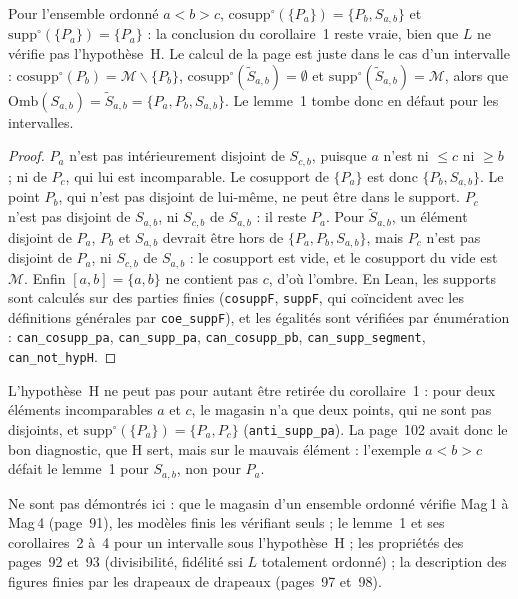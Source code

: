 \begin{center}
\end{center}

\begin{encadre}
\begin{contrexemple}
Pour l'ensemble ordonné $a < b > c$, $\mathrm{cosupp}^\circ(\{P_a\}) = \{P_b, S_{a,b}\}$ et $\mathrm{supp}^\circ(\{P_a\}) = \{P_a\}$ : la conclusion du corollaire~1 reste vraie, bien que $L$ ne vérifie pas l'hypothèse~H. Le calcul de la page est juste dans le cas d'un intervalle : $\mathrm{cosupp}^\circ(P_b) = \mathcal M \smallsetminus \{P_b\}$, $\mathrm{cosupp}^\circ(\widetilde S_{a,b}) = \emptyset$ et $\mathrm{supp}^\circ(\widetilde S_{a,b}) = \mathcal M$, alors que $\mathrm{Omb}(S_{a,b}) = \widetilde S_{a,b} = \{P_a, P_b, S_{a,b}\}$. Le lemme~1 tombe donc en défaut pour les intervalles.
\end{contrexemple}
\end{encadre}

\begin{proof}
$P_a$ n'est pas intérieurement disjoint de $S_{c,b}$, puisque $a$ n'est ni $\leq c$ ni $\geq b$ ; ni de $P_c$, qui lui est incomparable. Le cosupport de $\{P_a\}$ est donc $\{P_b, S_{a,b}\}$. Le point $P_b$, qui n'est pas disjoint de lui-même, ne peut être dans le support. $P_c$ n'est pas disjoint de $S_{a,b}$, ni $S_{c,b}$ de $S_{a,b}$ : il reste $P_a$. Pour $\widetilde S_{a,b}$, un élément disjoint de $P_a$, $P_b$ et $S_{a,b}$ devrait être hors de $\{P_a, P_b, S_{a,b}\}$, mais $P_c$ n'est pas disjoint de $P_a$, ni $S_{c,b}$ de $S_{a,b}$ : le cosupport est vide, et le cosupport du vide est $\mathcal M$. Enfin $[a,b] = \{a, b\}$ ne contient pas $c$, d'où l'ombre. En Lean, les supports sont calculés sur des parties finies (\texttt{cosuppF}, \texttt{suppF}, qui coïncident avec les définitions générales par \texttt{coe\_suppF}), et les égalités sont vérifiées par énumération : \texttt{can\_cosupp\_pa}, \texttt{can\_supp\_pa}, \texttt{can\_cosupp\_pb}, \texttt{can\_supp\_segment}, \texttt{can\_not\_hypH}.
\end{proof}

\begin{remarque}
L'hypothèse~H ne peut pas pour autant être retirée du corollaire~1 : pour deux éléments incomparables $a$ et $c$, le magasin n'a que deux points, qui ne sont pas disjoints, et $\mathrm{supp}^\circ(\{P_a\}) = \{P_a, P_c\}$ (\texttt{anti\_supp\_pa}). La page~102 avait donc le bon diagnostic, que H sert, mais sur le mauvais élément : l'exemple $a < b > c$ défait le lemme~1 pour $S_{a,b}$, non pour $P_a$.
\end{remarque}

Ne sont pas démontrés ici : que le magasin d'un ensemble ordonné vérifie Mag\,1 à Mag\,4 (page~91), les modèles finis les vérifiant seuls ; le lemme~1 et ses corollaires~2 à~4 pour un intervalle sous l'hypothèse~H ; les propriétés des pages~92 et~93 (divisibilité, fidélité ssi $L$ totalement ordonné) ; la description des figures finies par les drapeaux de drapeaux (pages~97 et~98).
